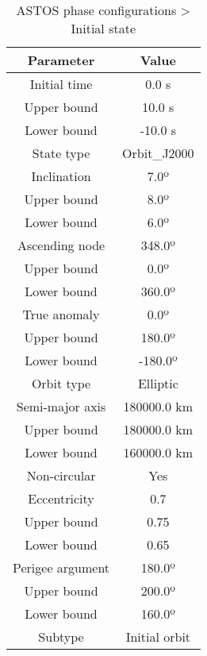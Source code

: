 \newpage

\begin{table}
\caption{ASTOS phase configurations > Initial state}
\label{tab:ASTOS-phase-configurations>initial-state}
\begin{center}
\begin{tabular}{|cc|}
\hline
Parameter & Value\\
\hline
\hline
Initial time & 0.0 s\\
Upper bound & 10.0 s\\
Lower bound & -10.0 s\\
\hline
State type & Orbit\_J2000\\
\hline
Inclination & 7.0º\\
Upper bound & 8.0º\\
Lower bound & 6.0º\\
\hline
Ascending node & 348.0º\\
Upper bound & 0.0º\\
Lower bound & 360.0º\\
\hline
True anomaly & 0.0º\\
Upper bound & 180.0º\\
Lower bound & -180.0º\\
\hline
Orbit type & Elliptic\\
\hline
Semi-major axis & 180000.0 km\\
Upper bound & 180000.0 km\\
Lower bound & 160000.0 km\\
\hline
Non-circular & Yes\\
\hline
Eccentricity & 0.7\\
Upper bound & 0.75\\
Lower bound & 0.65\\
\hline
Perigee argument & 180.0º\\
Upper bound & 200.0º\\
Lower bound & 160.0º\\
Subtype & Initial orbit\\
\hline
\end{tabular}
\end{center}
\end{table}

